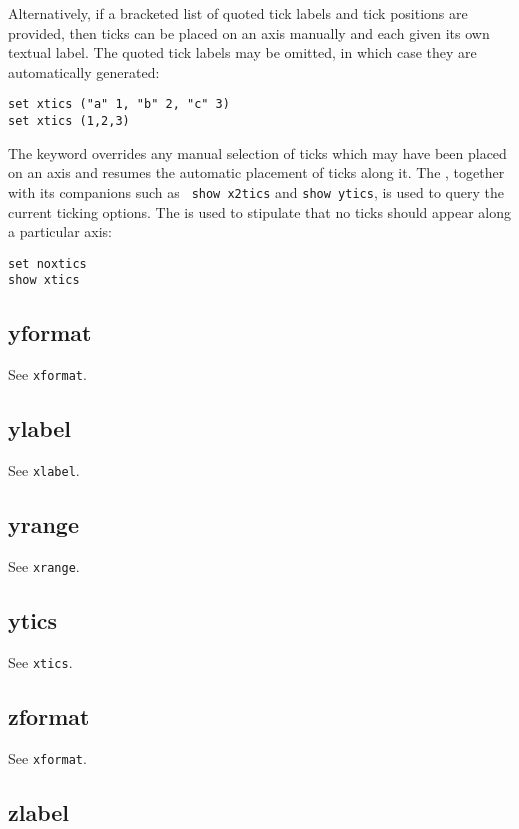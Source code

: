 Alternatively, if a bracketed list of quoted tick labels and tick positions are
provided, then ticks can be placed on an axis manually and each given its own
textual label. The quoted tick labels may be omitted, in which case they are
automatically generated:
\begin{verbatim}
set xtics ("a" 1, "b" 2, "c" 3)
set xtics (1,2,3)
\end{verbatim}
The keyword  overrides any manual selection of ticks which
may have been placed on an axis and resumes the automatic placement of ticks
along it. The , together with its companions such as {\tt
show x2tics} and {\tt show ytics}, is used to query the current ticking
options. The  is used to stipulate that no ticks should
appear along a particular axis:

\begin{verbatim}
set noxtics
show xtics
\end{verbatim}


\subsection{yformat}

See {\tt xformat}.


\subsection{ylabel}

See {\tt xlabel}.


\subsection{yrange}

See {\tt xrange}.


\subsection{ytics}

See {\tt xtics}.


\subsection{zformat}

See {\tt xformat}.


\subsection{zlabel}

